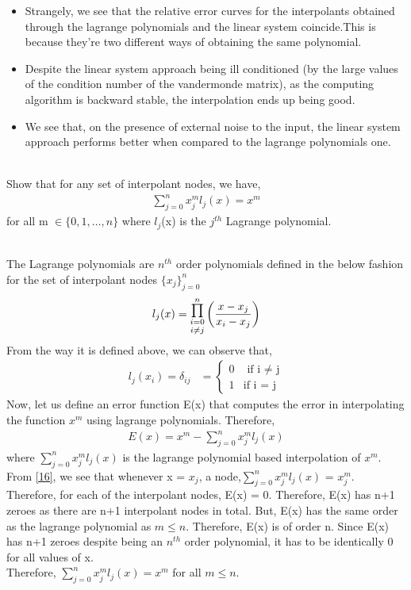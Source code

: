 \documentclass[letterpaper]{exam}
\begin{document}
\begin{questions}
\begin{parts}
\begin{solution}
\begin{itemize}
    \item Strangely, we see that the relative error curves for the interpolants obtained through the lagrange polynomials and the linear system coincide.This is because they're two different ways of obtaining the same polynomial.
    \item Despite the linear system approach being ill conditioned (by the large values of the condition number of the vandermonde matrix), as the computing algorithm is backward stable, the interpolation ends up being good.
    \item We see that, on the presence of external noise to the input, the linear system approach performs better when compared to the lagrange polynomials one.
\end{itemize}
\end{solution}
\end{parts}
\\
Show that for any set of interpolant nodes, we have,
\begin{align*}
    \sum_{j=0}^{n} x_{j}^{m}l_{j}(x) = x^{m}
\end{align*}
for all m $\in \{0,1,\ldots,n\}$ where $l_{j}$(x) is the $j^{th}$ Lagrange polynomial.
\begin{solution}
\\
The Lagrange polynomials are $n^{th}$ order polynomials defined in the below fashion for the set of interpolant nodes $\{x_j\}_{j=0}^{n}$
\begin{align}
    l_j(x) = \overset{n}{\underset{i \neq j}{\underset{i=0}{\mathlarger{\mathlarger{\mathlarger{\Pi}}}}}} \left(\frac{x-x_j}{x_i-x_j}\right)
\end{align}
From the way it is defined above, we can observe that,
\begin{align}\label{16}
    l_j(x_i)= \delta_{ij} &= \begin{cases}
                            0 & \mbox{ if i $\neq$ j}\\
                            1 & \mbox{if i = j}
    \end{cases}
\end{align}
Now, let us define an error function E(x) that computes the error in interpolating the function $x^m$ using lagrange polynomials.
Therefore,
\begin{align*}
    E(x) = x^m - \sum_{j=0}^{n} x_{j}^{m}l_{j}(x) 
\end{align*}
where $\sum_{j=0}^{n} x_{j}^{m}l_{j}(x)$ is the lagrange polynomial based interpolation of $x^{m}$.
\\
From \ref{16}, we see that whenever x = $x_{j}$, a node,$\sum_{j=0}^{n} x_{j}^{m}l_{j}(x)$ = $x_j^m$. Therefore, for each of the interpolant nodes, E(x) = 0. Therefore, E(x) has n+1 zeroes as there are n+1 interpolant nodes in total.
But, E(x) has the same order as the lagrange polynomial as $m \leq n$. Therefore, E(x) is of order n. Since E(x) has n+1 zeroes despite being an $n^{th}$ order polynomial, it has to be identically 0 for all values of x.\\
Therefore, $\sum_{j=0}^{n} x_{j}^{m}l_{j}(x) = x^m$ for all $m \leq n$.


\end{solution}
\end{questions}
\end{document}
